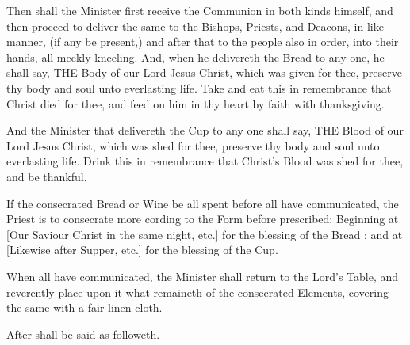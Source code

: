 

Then shall the Minister first receive the Communion in both kinds himself, and then proceed to deliver the same to the Bishops, Priests, and Deacons, in like manner, (if any be present,) and after that to the people also in order, into their hands, all meekly kneeling. And, when he delivereth the Bread to any one, he shall say,
THE Body of our Lord Jesus Christ, which was given for thee, preserve thy body and soul unto everlasting life. Take and eat this in remembrance that Christ died for thee, and feed on him in thy heart by faith with thanksgiving.

And the Minister that delivereth the Cup to any one shall say,
THE Blood of our Lord Jesus Christ, which was shed for thee, preserve thy body and soul unto everlasting life. Drink this in remembrance that Christ's Blood was shed for thee, and be thankful.

If the consecrated Bread or Wine be all spent before all have communicated, the Priest is to consecrate more cording to the Form before prescribed: Beginning at [Our Saviour Christ in the same night, etc.] for the blessing of the Bread ; and at [Likewise after Supper, etc.] for the blessing of the Cup.

When all have communicated, the Minister shall return to the Lord's Table, and reverently place upon it what remaineth of the consecrated Elements, covering the same with a fair linen cloth.

After shall be said as followeth.


